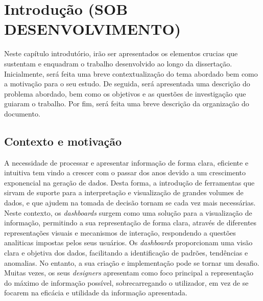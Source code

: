 
%

\chapter{Introdução (SOB DESENVOLVIMENTO)}
\label{cha:introducao}

Neste capítulo introdutório, irão ser apresentados os elementos crucias que sustentam e enquadram o trabalho desenvolvido ao longo da dissertação. Inicialmente, será feita uma breve contextualização do tema abordado bem como a motivação para o seu estudo. De seguida, será apresentada uma descrição do problema abordado, bem como os objetivos e as questões de investigação que guiaram o trabalho. Por fim, será feita uma breve descrição da organização do documento.

\section{Contexto e motivação}
\label{sec:cont_e_motiv}

A necessidade de processar e apresentar informação de forma clara, eficiente e intuitiva tem vindo a crescer com o passar dos anos devido a um crescimento exponencial na geração de dados. Desta forma, a introdução de ferramentas que sirvam de suporte para a interpretação e visualização de grandes volumes de dados, e que ajudem na tomada de decisão tornam se cada vez mais necessárias. Neste contexto, os \textit{dashboards} surgem como uma solução para a visualização de informação, permitindo a sua representação de forma clara, através de diferentes representações visuais e mecanismos de interação, respondendo a questões analiticas impostas pelos seus usuários. Os \textit{dashboards} proporcionam uma visão clara e objetiva dos dados, facilitando a identificação de padrões, tendências e anomalias. No entanto, a sua criação e implementação pode se tornar um desafio. Muitas vezes, os seus \textit{designers} apresentam como foco principal a representação do máximo de informação possível, sobrecarregando o utilizador, em vez de se focarem na eficácia e utilidade da informação apresentada.


